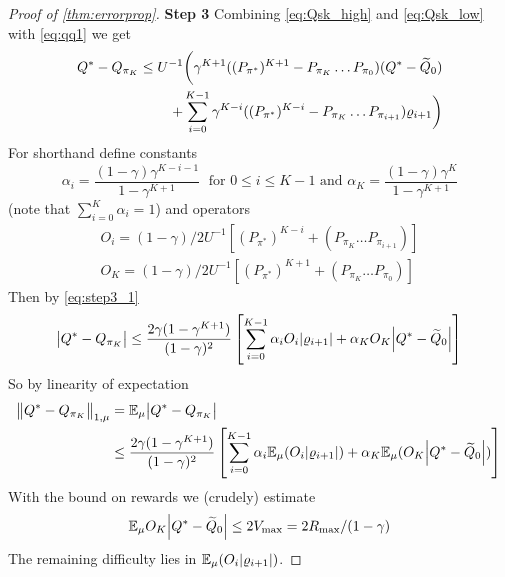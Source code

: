 \begin{proof}[Proof of \cref{thm:errorprop}]
  \textbf{Step 3}
Combining \cref{eq:Qsk_high} and \cref{eq:Qsk_low} with \cref{eq:qq1} we get
  \begin{equation}
    \begin{split}
      Q^* - Q_{\pi_K} \leq U^{-1} \bigg(
	\gamma^{K+1}((P_{\pi^*})^{K+1} - P_{\pi_K} \dots P_{\pi_0})(Q^* - \widetilde{Q}_0)
	\\ + \sum_{i=0}^{K-1} \gamma^{K-i}
      ((P_{\pi^*})^{K-i} - P_{\pi_K} \dots P_{\pi_{i+1}}) \varrho_{i+1} \bigg)
    \end{split}
    \label{eq:step3_1}
  \end{equation}
  For shorthand define constants
  \begin{equation} \alpha_i = \frac{(1-\gamma) \gamma^{K-i-1}}{1 - \gamma^{K+1}}
    \; \mbox{ for } 0 \leq i \leq K-1 \mbox{ and }
    \alpha_K = \frac{(1-\gamma) \gamma^K}{1 - \gamma^{K+1}}
  \end{equation}
  (note that $\sum_{i=0}^K \alpha_i = 1$) and operators
  \begin{align}
    O_i = (1-\gamma)/2 U^{-1} [(P_{\pi^*})^{K-i}
    + (P_{\pi_K} \dots P_{\pi_{i+1}})]
    \\ O_K = (1-\gamma)/2 U^{-1} [(P_{\pi^*})^{K+1}
    + (P_{\pi_K} \dots P_{\pi_0})]
  \end{align}
  Then by \cref{eq:step3_1}
  \begin{align}
    \abs{Q^* - Q_{\pi_K}} \leq \frac{2 \gamma (1- \gamma^{K+1})}{(1-\gamma)^2}
    \left[ \sum_{i=0}^{K-1} \alpha_i O_i \abs{\varrho_{i+1}}
    + \alpha_K O_K \abs{Q^* - \widetilde{Q}_0} \right]
  \end{align}
  So by linearity of expectation
  \begin{align}
    \norm{Q^* - Q_{\pi_K}}_{1, \mu} &= \mathbb{E}_\mu \abs{Q^* - Q_{\pi_K}}
    \\ &\leq \frac{2 \gamma (1- \gamma^{K+1})}{(1-\gamma)^2}
    \left[ \sum_{i=0}^{K-1} \alpha_i \mathbb{E}_\mu (O_i \abs{\varrho_{i+1}})
    + \alpha_K \mathbb{E}_\mu (O_K \abs{Q^* - \widetilde{Q}_0}) \right]
    \label{eq:step3_final}
  \end{align}
  With the bound on rewards we (crudely) estimate
  \begin{equation}
    \mathbb{E}_\mu O_K \abs{Q^* - \widetilde{Q}_0} \leq 2 V_{\max} = 2 R_{\max} / (1-\gamma)
    \label{eq:step3_crude}
  \end{equation}
  The remaining difficulty lies in $\mathbb{E}_\mu(O_i\abs{\varrho_{i+1}})$.


\end{proof}
